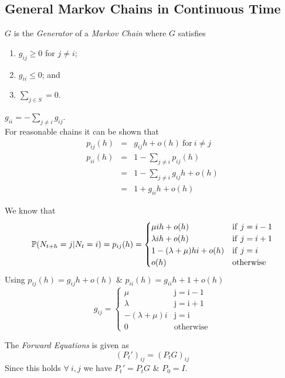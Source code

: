 \documentclass[11pt,a4paper]{article}
\begin{document}
\subsection{General Markov Chains in Continuous Time}

$G$ is the \textit{Generator} of a \textit{Markov Chain} where $G$ satisfies
\begin{enumerate}[label=\roman*)]
	\item $g_{ij}\geq0$ for $j\neq i$;
	\item $g_{ii}\leq0$; and
	\item $\sum_{j\in S}=0$.
\end{enumerate}
\nb $g_{ii}=-\sum_{j\neq i}g_{ij}$.\\

For reasonable chains it can be shown that
\[\begin{array}{rcl}
p_{ij}(h)&=&g_{ij}h+o(h)\ \mathrm{for\ }i\neq j\\
p_{ii}(h)&=&1-\sum_{j\neq i}p_{ij}(h)\\
&=&1-\sum_{j\neq i}g_{ij}h+o(h)\\
&=&1+g_{ii}h+o(h)
\end{array}\]

We know that
$$\prob(N_{t+h}=j|N_t=i)=p_{ij}(h)=\begin{cases}\mu ih+o(h)&\mathrm{if\ }j=i-1\\\lambda ih+o(h)&\mathrm{if\ }j=i+1\\1-(\lambda+\mu)hi+o(h)&\mathrm{if\ }j=i\\o(h)&\mathrm{otherwise}\end{cases}$$
Using $p_{ij}(h)=g_{ij}h+o(h)$ \& $p_{ii}(h)=g_{ii}h+1+o(h)$
$$g_{ij}=\begin{cases}\mu&\mathrm{j=i-1}\\\lambda&\mathrm{j=i+1}\\-(\lambda+\mu)i&\mathrm{j=i}\\0&\mathrm{otherwise}\end{cases}$$

The \textit{Forward Equations} is given as
$$(P_t')_{ij}=(P_tG)_{ij}$$
Since this holds $\forall\ i,j$ we have $P_t'=P_tG$ \& $P_0=I$.\\
\end{document}
